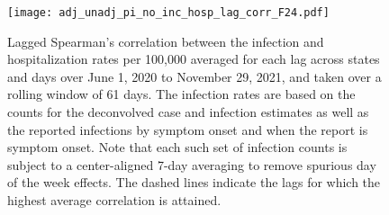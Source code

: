 \begin{figure}[H]
\centering
    \texttt{[image: adj\_unadj\_pi\_no\_inc\_hosp\_lag\_corr\_F24.pdf]} 
    \caption{Lagged Spearman's correlation between the infection and
    hospitalization rates per 100,000 averaged for each lag across \US states
    and days over June 1, 2020 to November 29, 2021, and taken over a rolling
    window of 61 days. The infection rates are based on the counts for the
    deconvolved case and infection estimates as well as the reported infections
    by symptom onset and when the report is symptom onset. Note that each such
    set of infection counts is subject to a center-aligned 7-day averaging to
    remove spurious day of the week effects. The dashed lines indicate the lags
    for which the highest average correlation is attained.}
    \label{fig:abl-lag-cor}
\end{figure}
 